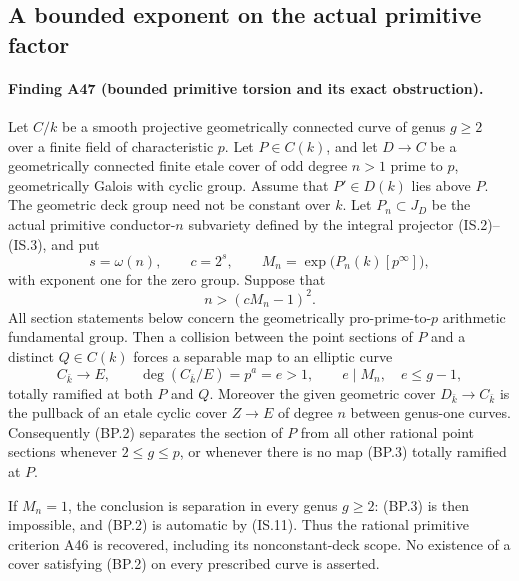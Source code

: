 \subsection{A bounded exponent on the actual primitive factor}
\label{sec:bounded-primitive-exponent}

\paragraph{Finding A47 (bounded primitive torsion and its exact obstruction).}
Let $C/k$ be a smooth projective geometrically connected curve
of genus $g\ge2$ over a finite field of characteristic $p$.
Let $P\in C(k)$, and let $D\to C$ be a geometrically connected
finite etale cover of odd degree $n>1$ prime to $p$, geometrically
Galois with cyclic group. Assume that $P'\in D(k)$ lies above $P$.
The geometric deck group need not be constant over $k$.
Let $P_n\subset J_D$ be the actual primitive conductor-$n$
subvariety defined by the integral projector (IS.2)--(IS.3), and put
\[
 s=\omega(n),\qquad c=2^s,\qquad
 M_n=\exp\bigl(P_n(k)[p^\infty]\bigr),
 \tag{BP.1}
\]
with exponent one for the zero group. Suppose that
\[
                         n>(cM_n-1)^2.
 \tag{BP.2}
\]
All section statements below concern the geometrically
pro-prime-to-$p$ arithmetic fundamental group.
Then a collision between the point sections of $P$ and a distinct
$Q\in C(k)$ forces a separable map to an elliptic curve
\[
 C_{\bar k}\longrightarrow E,
 \qquad \deg(C_{\bar k}/E)=p^a=e>1,
 \qquad e\mid M_n,\quad e\le g-1,
 \tag{BP.3}
\]
totally ramified at both $P$ and $Q$. Moreover the given geometric
cover $D_{\bar k}\to C_{\bar k}$ is the pullback of an etale
cyclic cover $Z\to E$ of degree $n$ between genus-one curves.
Consequently (BP.2) separates the section of $P$ from all other
rational point sections whenever $2\le g\le p$, or whenever
there is no map (BP.3) totally ramified at $P$.

If $M_n=1$, the conclusion is separation in every genus
$g\ge2$: (BP.3) is then impossible, and (BP.2) is automatic
by (IS.11). Thus the rational primitive criterion A46 is
recovered, including its nonconstant-deck scope. No existence
of a cover satisfying (BP.2) on every prescribed curve is asserted.

